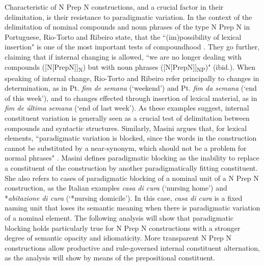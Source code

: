 \documentclass[output=paper]{langsci/langscibook}
\begin{document}
Characteristic of N Prep N constructions, and a crucial factor in their delimitation, is their resistance to paradigmatic variation. In the context of the delimitation of nominal compounds and noun phrases of the type N Prep N in Portuguese, Rio-Torto and Ribeiro state, that the ``(im)possibility of lexical insertion" is one of the most important tests of compoundhood \citep[9]{RioTorto:2012}. They go further, claiming that if internal changing is allowed, ``we are no longer dealing with compounds ([N[PrepN]]\textsubscript{N})  but with noun phrases ([N[PrepN]]\textsubscript{NP})" (ibid.). When speaking of internal change, Rio-Torto and Ribeiro refer principally to changes in determination, as in Pt. \textit{fim de semana} (`weekend') and Pt. \textit{fim da semana} (`end of this week'), and to changes effected through insertion of lexical material, as in \textit{fim de última semana} (`end of last week'). As these examples suggest, internal constituent variation is generally seen as a crucial test of delimitation between compounds and syntactic structures. Similarly, Masini argues that, for lexical elements, ``paradigmatic variation is blocked, since the words in the construction cannot be substituted by a near-synonym, which should not be a problem for normal phrases" \citep[259]{Masini:2009}. Masini defines paradigmatic blocking as the inability to replace a constituent of the construction by another paradigmatically fitting constituent. She also refers to cases of paradigmatic blocking of a nominal unit of a N Prep N construction, as the Italian examples \textit{casa di cura} (`nursing home') and *\textit{abitazione di cura} (`*nursing domicile'). In this case, \textit{casa di cura} is a fixed naming unit that loses its semantic meaning when there is paradigmatic variation of a nominal element. The following analysis will show that paradigmatic blocking holds particularly true for N Prep N constructions with a stronger degree of semantic opacity and idiomaticity. More transparent N Prep N constructions allow productive and rule-governed internal constituent alternation, as the analysis will show by means of the prepositional constituent.\\
 
\end{document}
